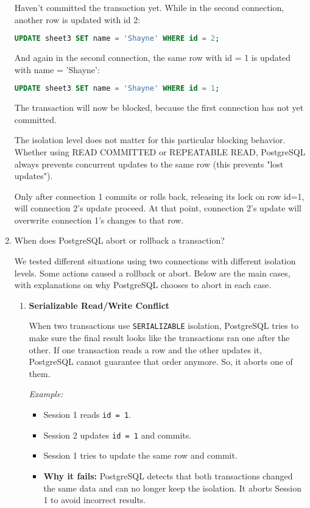 \documentclass{article}
\begin{document}
\begin{enumerate}[label=\alph*)]
        Haven't committed the transaction yet.
        While in the second connection, another row is updated with id 2:

        \begin{lstlisting}[language=sql]
UPDATE sheet3 SET name = 'Shayne' WHERE id = 2;
        \end{lstlisting}

        And again in the second connection, the same row with id = 1 is updated with name = 'Shayne':

        \begin{lstlisting}[language=sql]
UPDATE sheet3 SET name = 'Shayne' WHERE id = 1;
        \end{lstlisting}

        The transaction will now be blocked, because the first connection has not yet committed.

        The isolation level does not matter for this particular blocking behavior. Whether using READ COMMITTED or REPEATABLE READ, PostgreSQL always prevents concurrent updates to the same row (this prevents "lost updates").

        Only after connection 1 commits or rolls back, releasing its lock on row id=1, will connection 2's update proceed. At that point, connection 2's update will overwrite connection 1's changes to that row.


        \item When does PostgreSQL abort or rollback a transaction?
        
        We tested different situations using two connections with different isolation levels. Some actions caused a rollback or abort. Below are the main cases, with explanations on why PostgreSQL chooses to abort in each case.

        \begin{enumerate}
                \item \textbf{Serializable Read/Write Conflict}

When two transactions use \texttt{SERIALIZABLE} isolation, PostgreSQL tries to make sure the final result looks like the transactions ran one after the other. If one transaction reads a row and the other updates it, PostgreSQL cannot guarantee that order anymore. So, it aborts one of them.

    \textit{Example:}
    \begin{itemize}
        \item Session 1 reads \texttt{id = 1}.
        \item Session 2 updates \texttt{id = 1} and commits.
        \item Session 1 tries to update the same row and commit.
        \item \textbf{Why it fails:} 
        PostgreSQL detects that both transactions changed the same data and can no longer keep the isolation. It aborts Session 1 to avoid incorrect results.
    \end{itemize}


\end{enumerate}
\end{enumerate}
\end{document}

